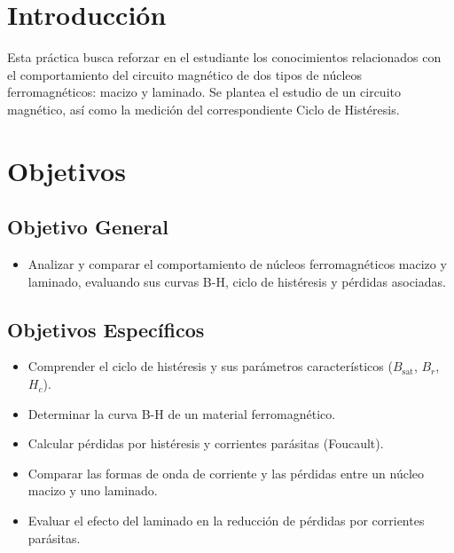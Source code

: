 \section{Introducción}

Esta práctica busca reforzar en el estudiante los conocimientos relacionados con el comportamiento del circuito magnético de dos tipos de núcleos ferromagnéticos: macizo y laminado. Se plantea el estudio de un circuito magnético, así como la medición del correspondiente Ciclo de Histéresis.

\section{Objetivos}

\subsection*{Objetivo General}
\begin{itemize}
    \item Analizar y comparar el comportamiento de núcleos ferromagnéticos macizo y laminado, evaluando sus curvas B-H, ciclo de histéresis y pérdidas asociadas.
\end{itemize}

\subsection*{Objetivos Específicos}
\begin{itemize}
    \item Comprender el ciclo de histéresis y sus parámetros característicos ($B_{\text{sat}}$, $B_r$, $H_c$).
    \item Determinar la curva B-H de un material ferromagnético.
    \item Calcular pérdidas por histéresis y corrientes parásitas (Foucault).
    \item Comparar las formas de onda de corriente y las pérdidas entre un núcleo macizo y uno laminado.
    \item Evaluar el efecto del laminado en la reducción de pérdidas por corrientes parásitas.
\end{itemize}
